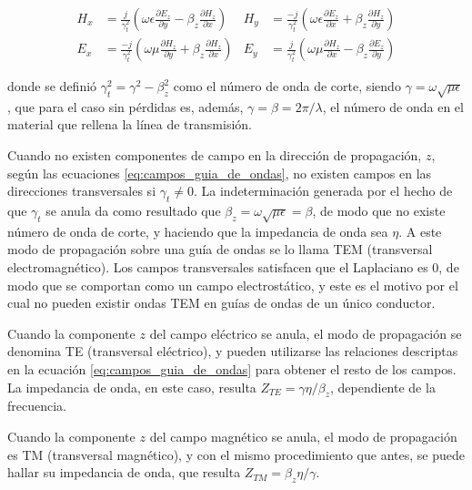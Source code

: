 \begin{equation}
	\begin{aligned}
		H_x &= \frac{j}{\gamma_t^2} \left(\omega \epsilon \frac{\partial E_z}{\partial y} - \beta_z \frac{\partial H_z}{\partial x} \right) & H_y &= \frac{-j}{\gamma_t^2} \left(\omega \epsilon \frac{\partial E_z}{\partial x} + \beta_z \frac{\partial H_z}{\partial y} \right)\\
		E_x &= \frac{-j}{\gamma_t^2} \left(\omega \mu \frac{\partial H_z}{\partial y} + \beta_z \frac{\partial H_z}{\partial x} \right) & E_y &= \frac{j}{\gamma_t^2} \left(\omega \mu \frac{\partial H_z}{\partial x} - \beta_z \frac{\partial E_z}{\partial y} \right)
	\end{aligned}
	\label{eq:campos_guia_de_ondas}
\end{equation}

donde se definió $\gamma_t^2 = \gamma^2 - \beta_z^2$ como el número de onda de corte, siendo $\gamma = \omega \sqrt{\mu \epsilon}$, que para el caso sin pérdidas es, además, $\gamma = \beta = 2\pi/\lambda$, el número de onda  en el material que rellena la línea de transmisión.

Cuando no existen componentes de campo en la dirección de propagación, $z$, según las ecuaciones \ref{eq:campos_guia_de_ondas}, no existen campos en las direcciones transversales si $\gamma_t \neq 0$. La indeterminación generada por el hecho de que $\gamma_t$ se anula da como resultado que $\beta_z = \omega \sqrt{\mu \epsilon} = \beta$, de modo que no existe número de onda de corte, y haciendo que la impedancia de onda sea $\eta$.  A este modo de propagación sobre una guía de ondas se lo llama TEM (transversal electromagnético). Los campos transversales satisfacen que el Laplaciano es 0, de modo que se comportan como un campo electrostático, y este es el motivo por el cual no pueden existir ondas TEM en guías de ondas de un único conductor.

Cuando la componente $z$ del campo eléctrico se anula, el modo de propagación se denomina TE (transversal eléctrico), y pueden utilizarse las relaciones descriptas en la ecuación \ref{eq:campos_guia_de_ondas} para obtener el resto de los campos. La impedancia de onda, en este caso, resulta $Z_{TE} = \gamma\eta/\beta_z$, dependiente de la frecuencia.

Cuando la componente $z$ del campo magnético se anula, el modo de propagación es TM (transversal magnético), y con el mismo procedimiento que antes, se puede hallar su impedancia de onda, que resulta $Z_{TM} = \beta_z \eta / \gamma$.

